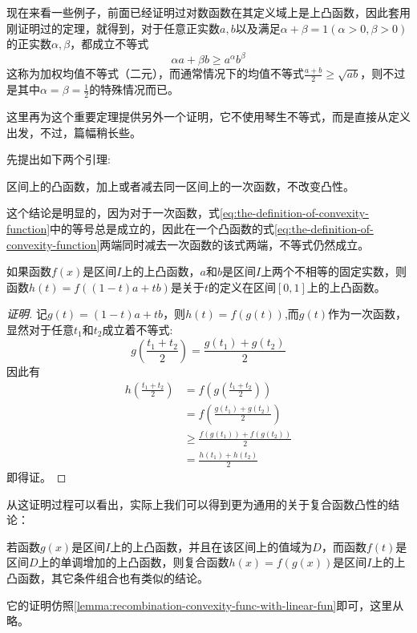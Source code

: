 现在来看一些例子，前面已经证明过对数函数在其定义域上是上凸函数，因此套用刚证明过的定理，就得到，对于任意正实数$a,b$以及满足$\alpha+\beta=1(\alpha>0,\beta>0)$的正实数$\alpha,\beta$，都成立不等式
\begin{equation}
  \label{eq:binary-neq-for-mean-with-weight}
\alpha a + \beta b \geqslant a^{\alpha}b^{\beta}
\end{equation}
这称为加权均值不等式（二元），而通常情况下的均值不等式$\frac{a+b}{2}\geqslant \sqrt{ab}$，则不过是其中$\alpha=\beta=\frac{1}{2}$的特殊情况而已。

这里再为这个重要定理提供另外一个证明，它不使用琴生不等式，而是直接从定义出发，不过，篇幅稍长些。

先提出如下两个引理:
\begin{lemma}
  \label{lemma:add-linear-fun-to-convexity-funtion}
  区间上的凸函数，加上或者减去同一区间上的一次函数，不改变凸性。
\end{lemma}
这个结论是明显的，因为对于一次函数，式\ref{eq:the-definition-of-convexity-function}中的等号总是成立的，因此在一个凸函数的式\ref{eq:the-definition-of-convexity-function}两端同时减去一次函数的该式两端，不等式仍然成立。

\begin{lemma}
  \label{lemma:recombination-convexity-func-with-linear-fun}
如果函数$f(x)$是区间$I$上的上凸函数，$a$和$b$是区间$I$上两个不相等的固定实数，则函数$h(t)=f((1-t)a+tb)$是关于$t$的定义在区间$[0,1]$上的上凸函数。
\end{lemma}
\begin{proof}[证明]
 记$g(t)=(1-t)a+tb$，则$h(t)=f(g(t))$,而$g(t)$作为一次函数，显然对于任意$t_1$和$t_2$成立着不等式:
\[ g \left( \frac{t_1+t_2}{2} \right)=\frac{g(t_1)+g(t_2)}{2} \] 
因此有
\begin{align*}
  h \left( \frac{t_1+t_2}{2} \right) &= f \left( g\left( \frac{t_1+t_2}{2} \right) \right) \\
& = f \left( \frac{g(t_1)+g(t_2)}{2} \right) \\
& \geqslant \frac{f(g(t_1))+f(g(t_2))}{2} \\
& = \frac{h(t_1)+h(t_2)}{2}
\end{align*}
即得证。
\end{proof}

从这证明过程可以看出，实际上我们可以得到更为通用的关于复合函数凸性的结论：
\begin{theorem}
  若函数$g(x)$是区间$I$上的上凸函数，并且在该区间上的值域为$D$，而函数$f(t)$是区间$D$上的单调增加的上凸函数，则复合函数$h(x)=f(g(x))$是区间$I$上的上凸函数，其它条件组合也有类似的结论。
\end{theorem}
它的证明仿照\autoref{lemma:recombination-convexity-func-with-linear-fun}即可，这里从略。

